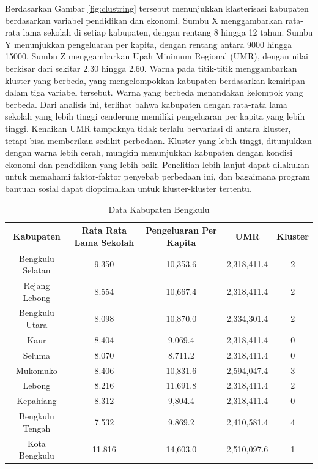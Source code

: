 \documentclass{article}
\begin{document}
Berdasarkan Gambar \ref{fig:clustring} tersebut menunjukkan klasterisasi kabupaten berdasarkan variabel pendidikan dan ekonomi. Sumbu X menggambarkan rata-rata lama sekolah di setiap kabupaten, dengan rentang 8 hingga 12 tahun. Sumbu Y menunjukkan pengeluaran per kapita, dengan rentang antara 9000 hingga 15000. Sumbu Z menggambarkan Upah Minimum Regional (UMR), dengan nilai berkisar dari sekitar 2.30 hingga 2.60. Warna pada titik-titik menggambarkan kluster yang berbeda, yang mengelompokkan kabupaten berdasarkan kemiripan dalam tiga variabel tersebut. Warna yang berbeda menandakan kelompok yang berbeda. Dari analisis ini, terlihat bahwa kabupaten dengan rata-rata lama sekolah yang lebih tinggi cenderung memiliki pengeluaran per kapita yang lebih tinggi. Kenaikan UMR tampaknya tidak terlalu bervariasi di antara kluster, tetapi bisa memberikan sedikit perbedaan. Kluster yang lebih tinggi, ditunjukkan dengan warna lebih cerah, mungkin menunjukkan kabupaten dengan kondisi ekonomi dan pendidikan yang lebih baik. Penelitian lebih lanjut dapat dilakukan untuk memahami faktor-faktor penyebab perbedaan ini, dan bagaimana program bantuan sosial dapat dioptimalkan untuk kluster-kluster tertentu.

\begin{table}[h]
    \centering
    \begin{tabular}{ccccc}
        \hline
        \textbf{Kabupaten} & \textbf{Rata Rata Lama Sekolah} & \textbf{Pengeluaran Per Kapita} & \textbf{UMR} & \textbf{Kluster} \\
        \hline
        Bengkulu Selatan & 9.350 & 10,353.6 & 2,318,411.4 & 2 \\
        Rejang Lebong & 8.554 & 10,667.4 & 2,318,411.4 & 2 \\
        Bengkulu Utara & 8.098 & 10,870.0 & 2,334,301.4 & 2 \\
        Kaur & 8.404 & 9,069.4 & 2,318,411.4 & 0 \\
        Seluma & 8.070 & 8,711.2 & 2,318,411.4 & 0 \\
        Mukomuko & 8.406 & 10,831.6 & 2,594,047.4 & 3 \\
        Lebong & 8.216 & 11,691.8 & 2,318,411.4 & 2 \\
        Kepahiang & 8.312 & 9,804.4 & 2,318,411.4 & 0 \\
        Bengkulu Tengah & 7.532 & 9,869.2 & 2,410,581.4 & 4 \\
        Kota Bengkulu & 11.816 & 14,603.0 & 2,510,097.6 & 1 \\
        \hline
    \end{tabular}
    \caption{Data Kabupaten Bengkulu}
    \label{tab:data_hasil_cluster}
\end{table}
\end{document}
